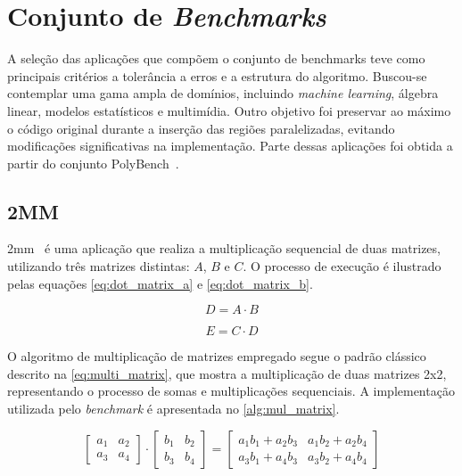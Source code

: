 \section{Conjunto de \textit{Benchmarks}}\label{sec:benchmark}

A seleção das aplicações que compõem o conjunto de benchmarks teve como principais critérios a tolerância a erros e a estrutura do algoritmo. Buscou-se contemplar uma gama ampla de domínios, incluindo \textit{machine learning}, álgebra linear, modelos estatísticos e multimídia. Outro objetivo foi preservar ao máximo o código original durante a inserção das regiões paralelizadas, evitando modificações significativas na implementação. Parte dessas aplicações foi obtida a partir do conjunto PolyBench~\cite{polybench}.

\subsection{2MM}\label{subsec:2mm}

2mm~\cite{polybench} é uma aplicação que realiza a multiplicação sequencial de duas matrizes, utilizando três matrizes distintas: $A$, $B$ e $C$. O processo de execução é ilustrado pelas equações \autoref{eq:dot_matrix_a} e \autoref{eq:dot_matrix_b}.

\begin{equation}
	\label{eq:dot_matrix_a}
	D = A \cdot B
\end{equation}

\begin{equation}
	\label{eq:dot_matrix_b}
	E = C \cdot D
\end{equation}

O algoritmo de multiplicação de matrizes empregado segue o padrão clássico~\cite{axler2015} descrito na \autoref{eq:multi_matrix}, que mostra a multiplicação de duas matrizes 2x2, representando o processo de somas e multiplicações sequenciais. A implementação utilizada pelo \textit{benchmark} é apresentada no \autoref{alg:mul_matrix}.

\begin{equation}
	\label{eq:multi_matrix}
	\begin{bmatrix}
		a_1 & a_2 \\
		a_3 & a_4
	\end{bmatrix}
	\cdot
	\begin{bmatrix}
		b_1 & b_2 \\
		b_3 & b_4
	\end{bmatrix}
	=
	\begin{bmatrix}
		a_1b_1 + a_2b_3 & a_1b_2 + a_2b_4 \\
		a_3b_1 + a_4b_3 & a_3b_2 + a_4b_4
	\end{bmatrix}
\end{equation}

